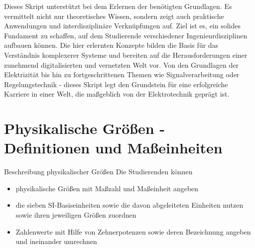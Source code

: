 {\begin{itemize}
	  \end{itemize}
	Dieses Skript unterstützt bei dem Erlernen der benötigten Grundlagen. Es vermittelt nicht nur theoretisches Wissen, sondern zeigt auch praktische Anwendungen und interdisziplinäre Verknüpfungen auf. Ziel ist es, ein solides Fundament zu schaffen, auf dem Studierende verschiedener Ingenieurdisziplinen aufbauen können.
	Die hier erlernten Konzepte bilden die Basis für das Verständnis komplexerer Systeme und bereiten auf die Herausforderungen einer zunehmend digitalisierten und vernetzten Welt vor. Von den Grundlagen der Elektrizität bis hin zu fortgeschrittenen Themen wie Signalverarbeitung oder Regelungstechnik - dieses Skript legt den Grundstein für eine erfolgreiche Karriere in einer Welt, die maßgeblich von der Elektrotechnik geprägt ist.
	
}

\newpage

\section{Physikalische Größen - Definitionen und Maßeinheiten}


\begin{frame}{}

	\begin{Lernziele}{Beschreibung physikalischer Größen}
        Die Studierenden können
        \begin{itemize}
            \item physikalische Größen mit Maßzahl und Maßeinheit angeben
            \item die sieben SI-Basiseinheiten sowie die davon abgeleiteten Einheiten nutzen sowie ihren
			jeweiligen Größen zuordnen
			\item Zahlenwerte mit Hilfe von Zehnerpotenzen sowie deren Bezeichnung angeben und ineinander
			umrechnen
        \end{itemize}
    \end{Lernziele}
	
\end{frame}

